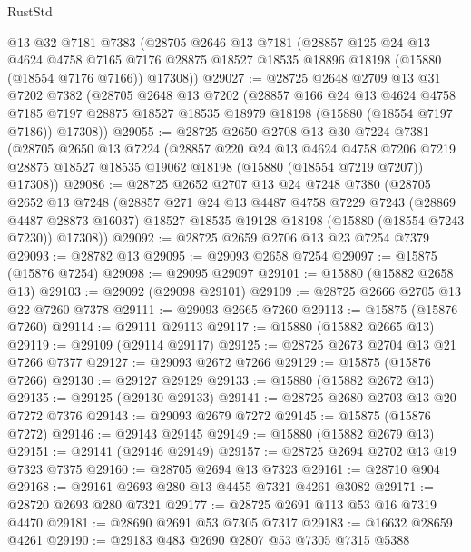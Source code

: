 \begin{lexlean}{RustStd}
\begin{coremodule}
    @13
    @32
    @7181
    @7383
    (@28705
      @2646
      @13
      @7181
      (@28857
        @125
        @24
        @13
        @4624
        @4758
        @7165
        @7176
        @28875
        @18527
        @18535
        @18896
        @18198
        (@15880 (@18554 @7176 @7166))
        @17308))
@29027 := @28725
    @2648
    @2709
    @13
    @31
    @7202
    @7382
    (@28705
      @2648
      @13
      @7202
      (@28857
        @166
        @24
        @13
        @4624
        @4758
        @7185
        @7197
        @28875
        @18527
        @18535
        @18979
        @18198
        (@15880 (@18554 @7197 @7186))
        @17308))
@29055 := @28725
    @2650
    @2708
    @13
    @30
    @7224
    @7381
    (@28705
      @2650
      @13
      @7224
      (@28857
        @220
        @24
        @13
        @4624
        @4758
        @7206
        @7219
        @28875
        @18527
        @18535
        @19062
        @18198
        (@15880 (@18554 @7219 @7207))
        @17308))
@29086 := @28725
    @2652
    @2707
    @13
    @24
    @7248
    @7380
    (@28705
      @2652
      @13
      @7248
      (@28857
        @271
        @24
        @13
        @4487
        @4758
        @7229
        @7243
        (@28869 @4487 @28873 @16037)
        @18527
        @18535
        @19128
        @18198
        (@15880 (@18554 @7243 @7230))
        @17308))
@29092 := @28725 @2659 @2706 @13 @23 @7254 @7379
@29093 := @28782 @13
@29095 := @29093 @2658 @7254
@29097 := @15875 (@15876 @7254)
@29098 := @29095 @29097
@29101 := @15880 (@15882 @2658 @13)
@29103 := @29092 (@29098 @29101)
@29109 := @28725 @2666 @2705 @13 @22 @7260 @7378
@29111 := @29093 @2665 @7260
@29113 := @15875 (@15876 @7260)
@29114 := @29111 @29113
@29117 := @15880 (@15882 @2665 @13)
@29119 := @29109 (@29114 @29117)
@29125 := @28725 @2673 @2704 @13 @21 @7266 @7377
@29127 := @29093 @2672 @7266
@29129 := @15875 (@15876 @7266)
@29130 := @29127 @29129
@29133 := @15880 (@15882 @2672 @13)
@29135 := @29125 (@29130 @29133)
@29141 := @28725 @2680 @2703 @13 @20 @7272 @7376
@29143 := @29093 @2679 @7272
@29145 := @15875 (@15876 @7272)
@29146 := @29143 @29145
@29149 := @15880 (@15882 @2679 @13)
@29151 := @29141 (@29146 @29149)
@29157 := @28725 @2694 @2702 @13 @19 @7323 @7375
@29160 := @28705 @2694 @13 @7323
@29161 := @28710 @904
@29168 := @29161 @2693 @280 @13 @4455 @7321 @4261 @3082
@29171 := @28720 @2693 @280 @7321
@29177 := @28725 @2691 @113 @53 @16 @7319 @4470
@29181 := @28690 @2691 @53 @7305 @7317
@29183 := @16632 @28659 @4261
@29190 := @29183 @483 @2690 @2807 @53 @7305 @7315 @5388

\end{coremodule}
\end{lexlean}
